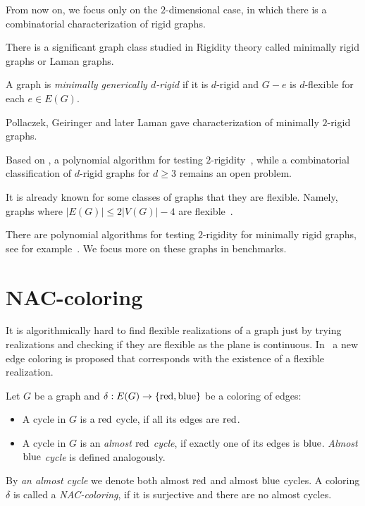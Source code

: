 From now on, we focus only on the \( 2 \)-dimensional case,
in which there is a combinatorial characterization of rigid graphs.

There is a significant graph class studied in Rigidity theory
called minimally rigid graphs or Laman graphs.
%
\begin{definition}
	A graph is \emph{minimally generically \( d \)-rigid} if it is \( d \)-rigid
	and \( G - e \) is \(d\)-flexible for each \( e \in E(G) \).
\end{definition}
%
Pollaczek, Geiringer and later Laman gave characterization of minimally $2$-rigid graphs.
%
%
Based on , a polynomial algorithm
for testing $2$-rigidity~\cite{polynomial-min-rigid},
while a combinatorial classification of $d$-rigid graphs for $d\geq 3$ remains an open problem.

It is already known for some classes of graphs that they are flexible.
Namely, graphs where \( |E(G)| \le 2|V(G)| - 4 \)
are flexible~\cite{stable_cuts_2v_4}.

There are polynomial algorithms for testing \( 2 \)-rigidity
for minimally rigid graphs, see for example~\cite{polynomial-min-rigid}.
We focus more on these graphs in benchmarks.

\section{NAC-coloring}

It is algorithmically hard to find flexible realizations of a graph
just by trying realizations and checking if they are flexible
as the plane is continuous.
In~\cite{legersky_original} a new edge coloring is proposed
that corresponds with the existence of a flexible realization.

\begin{definition}
	Let \( G \) be a graph and \( \delta: E(G) \to \{ \text{red}, \text{blue} \} \)
	be a coloring of edges:
	\begin{itemize}
		\item A cycle in \( G \) is a \( \text{red} \) cycle, if all its edges are \( \text{red} \).
		\item A cycle in \( G \) is an \emph{almost \( \text{red} \) cycle},
		      if exactly one of its edges is \( \text{blue} \).
		      \emph{Almost \( \text{blue} \) cycle} is defined analogously.
	\end{itemize}
	By \emph{an almost cycle} we denote both almost \( \text{red} \) and almost \( \text{blue} \) cycles.
	A coloring \( \delta \) is called a \emph{NAC-coloring}, if it is surjective
	and there are no almost cycles.
\end{definition}
%

